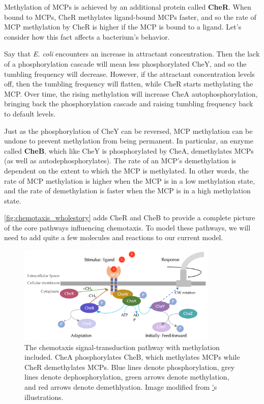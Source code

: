 Methylation of MCPs is achieved by an additional protein called \textbf{CheR}. When bound to MCPs, CheR methylates ligand-bound MCPs faster, and so the rate of MCP methylation by CheR is higher if the MCP is bound to a ligand. Let's consider how this fact affects a bacterium's behavior.

Say that \textit{E. coli} encounters an increase in attractant concentration. Then the lack of a phosphorylation cascade will mean less phosphorylated CheY, and so the tumbling frequency will decrease. However, if the attractant concentration levels off, then the tumbling frequency will flatten, while CheR starts methylating the MCP. Over time, the rising methylation will increase CheA autophosphorylation, bringing back the phosphorylation cascade and raising tumbling frequency back to default levels.

Just as the phosphorylation of CheY can be reversed, MCP methylation can be undone to prevent methylation from being permanent. In particular, an enzyme called \textbf{CheB}, which like CheY is phosphorylated by CheA, demethylates MCPs (as well as autodephosphorylates). The rate of an MCP's demethylation is dependent on the extent to which the MCP is methylated. In other words, the rate of MCP methylation is higher when the MCP is in a low methylation state, and the rate of demethylation is faster when the MCP is in a high methylation state.

\autoref{fig:chemotaxis_wholestory} adds CheR and CheB to provide a complete picture of the core pathways influencing chemotaxis. To model these pathways, we will need to add quite a few molecules and reactions to our current model.\\

\begin{figure}[h]
\centering
\mySfFamily
\includegraphics[width = 0.85\textwidth]{../images/chemotaxis_wholestory.png}
\caption{The chemotaxis signal-transduction pathway with methylation included. CheA phosphorylates CheB, which methylates MCPs while CheR demethylates MCPs. Blue lines denote phosphorylation, grey lines denote dephosphorylation, green arrows denote methylation, and red arrows denote demethlyation. Image modified from \href{http://chemotaxis.biology.utah.edu/Parkinson_Lab/projects/ecolichemotaxis/ecolichemotaxis.html}'s illustrations.}
\label{fig:chemotaxis_wholestory}
\end{figure}


